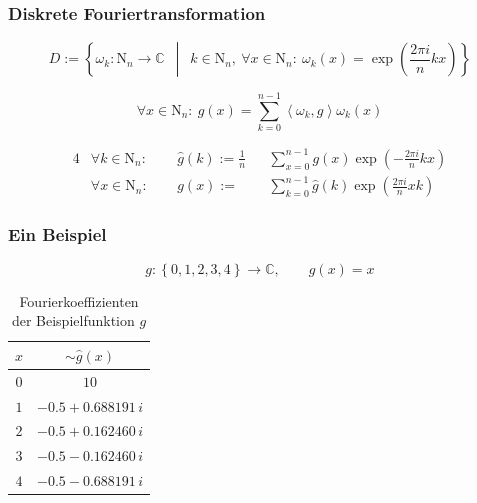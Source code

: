 \documentclass[aspectratio=169]{beamer}
\newcommand{\curlb}[1]{\left\{ #1 \right\}}
\newcommand{\curvb}[1]{\left( #1 \right)}
\newcommand{\angleb}[1]{\left\langle #1 \right\rangle}
\newcommand{\set}[2]{ \left\{ #1 \enspace \middle\vert \enspace #2 \right\} }
\newcommand{\SC}{\mathds{C}} %
\begin{document}

			\begin{frame}
				\frametitle{Diskrete Fouriertransformation}
				\begin{tcolorbox}[title=Orthonormalbasis des $\SC^n$ bezüglich Standardskalarprodukt]
					\[ D := \set{\omega_k:\mathrm{N}_n\longrightarrow\SC}{ k\in\mathrm{N}_n,\ \forall x\in\mathrm{N}_n:\ \omega_k(x) = \exp\curvb{\frac{2\pi i}{n}kx} } \]
				\end{tcolorbox}
				\begin{tcolorbox}[title=Parsevalsche Gleichung]
					\[ \forall x\in\mathrm{N}_n: \ g(x) = \sum_{k=0}^{n-1} \angleb{\omega_k, g} \omega_k(x) \]
				\end{tcolorbox}
			\end{frame}

			\begin{frame}[label=dft]
				\begin{tcolorbox}[title=Diskrete Fouriertransformation]
					\begin{alignat*}{4}
						&\forall k\in\mathrm{N}_n: \ &&\ \hat{g}(k) := \frac{1}{n} &&\sum_{x=0}^{n-1} g(x)\exp\curvb{ -\frac{2\pi i}{n}kx } \\
						&\forall x\in\mathrm{N}_n: \ &&\ g(x) := &&\sum_{k=0}^{n-1} \hat{g}(k)\exp\curvb{ \frac{2\pi i}{n}xk }
					\end{alignat*}
				\end{tcolorbox}
			\end{frame}

			\begin{frame}
				\frametitle{Ein Beispiel}
				\begin{tcolorbox}
					\[ g:\curlb{0,1,2,3,4}\longrightarrow\SC,\qquad g(x)=x \]
					\begin{table}
						\center
						\setlength{\extrarowheight}{4pt}
						\begin{tabular}{c|c}
							\hline
							$x$ & $\sim\hat{g}(x)$ \\ [1ex]
							\hline
							\hline
							$0$ & $10$ \\
							$1$ & $-0.5 + 0.688191\,i$ \\
							$2$ & $-0.5 + 0.162460\,i$ \\
							$3$ & $-0.5 - 0.162460\,i$ \\
							$4$ & $-0.5 - 0.688191\,i$ \\
							\hline
						\end{tabular}
						\caption{Fourierkoeffizienten der Beispielfunktion $g$}
						\label{tab:example}
					\end{table}
				\end{tcolorbox}
			\end{frame}
\end{document}
